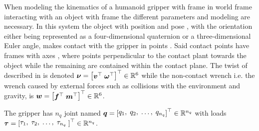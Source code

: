 When modeling the kinematics of a humanoid gripper with frame  in world frame  interacting with an object with frame  the different parameters and modeling are necessary. In this system the object with position  and pose , with the orientation either being represented as a four-dimensional quaternion or a three-dimensional Euler angle, makes contact with the gripper in points . Said contact points have frames  with axes , where  points perpendicular to the contact plant towards the object while the remaining are contained within the contact plane. The twist of  described in  is denoted $\vec{\nu} = \rvec{\vec{v}^\T\; \vec{\omega}^\T}^\T\inR{6} $ while the non-contact wrench i.e. the wrench caused by external forces such as collisions with the environment and gravity, is $\vec{w} = \rvec{\vec{f}^\T\; \vec{m}^\T}^\T\inR{6}$. \medskip

The gripper has $n_q$ joint named $\vec{q} = \rvec{q_1,\; q_2,\; \dots,\; q_{n_q}}^\T\in\R^{n_q}$ with loads $\vec{\tau} = \rvec{\tau_1,\;\tau_2,\;\dots,\;\tau_{n_q}\;}^\T\in\R^{n_q}$.








